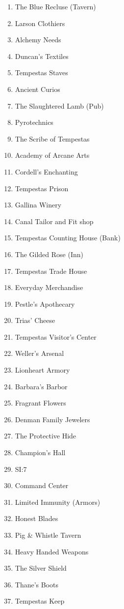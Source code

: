 \begin{center}
	{\begin{multicols}{3}
		\begin{enumerate}
			\item The Blue Recluse (Tavern)
			\item Larson Clothiers
			\item Alchemy Needs
			\item Duncan's Textiles
			\item Tempestas Staves
			\item Ancient Curios
			\item The Slaughtered Lamb (Pub)
			\item Pyrotechnics
			\item The Scribe of Tempestas
			\item Academy of Arcane Arts
			\item Cordell's Enchanting
			\item Tempestas Prison
			\item Gallina Winery
			\item Canal Tailor and Fit shop
			\item Tempestas Counting House (Bank)
			\item The Gilded Rose (Inn)
			\item Tempestas Trade House
			\item Everyday Merchandise
			\item Pestle's Apothecary
			\item Trias' Cheese
			\item Tempestas Visitor's Center
			\item Weller's Arsenal
			\item Lionheart Armory
			\item Barbara's Barbor
			\item Fragrant Flowers
			\item Denman Family Jewelers
			\item The Protective Hide
			\item Champion's Hall
			\item SI:7
			\item Command Center
			\item Limited Immunity (Armors)
			\item Honest Blades
			\item Pig \& Whistle Tavern
			\item Heavy Handed Weapons
			\item The Silver Shield
			\item Thane's Boots
			\item Tempestas Keep

\end{enumerate}
\end{multicols}}
\end{center}
